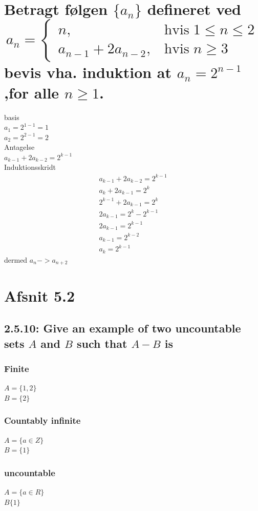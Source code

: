 \documentclass[12pt, a4paper]{report}
\begin{document}
			\section{Betragt følgen $\{a_n\}$ defineret ved $$a_n=\begin{cases}n,&\text{hvis}\; 1\leq n \leq 2\\ a_{n-1}+2a_{n-2},&\text{hvis}\; n\geq 3\end{cases}$$ bevis vha. induktion at $a_n=2^{n-1}$,for alle $n\geq 1$.}
				basis\\
				$a_1 = 2^{1-1}=1$\\
				$a_2 = 2^{2-1}=2$\\
				Antagelse\\
				$a_{k-1}+2a_{k-2}=2^{k-1}$\\
				Induktionsskridt\\
				\begin{align*}
					a_{k-1}+2a_{k-2}=2^{k-1}\\[4mm]
					a_k+2a_{k-1}=2^k\\
					2^{k-1}+2a_{k-1}=2^k\\
					2a_{k-1}=2^k-2^{k-1}\\
					2a_{k-1}=2^{k-1}\\
					a_{k-1}=2^{k-2}\\
					a_k=2^{k-1}
				\end{align*}
				dermed $a_n->a_{n+2}$
			\section{Afsnit 5.2}
				\setcounter{subsection}{9}
				\subsection{2.5.10: Give an example of two uncountable sets $A$ and $B$ such that $A-B$ is}
					\subsubsection{Finite}
						$A=\{1,2\}$\\
						$B=\{2\}$
					\subsubsection{Countably infinite}
						$A=\{a\in Z\}$\\
						$B=\{1\}$
					\subsubsection{uncountable}
						$A=\{a\in R\}$\\
						$B\{1\}$
					
\end{document}
